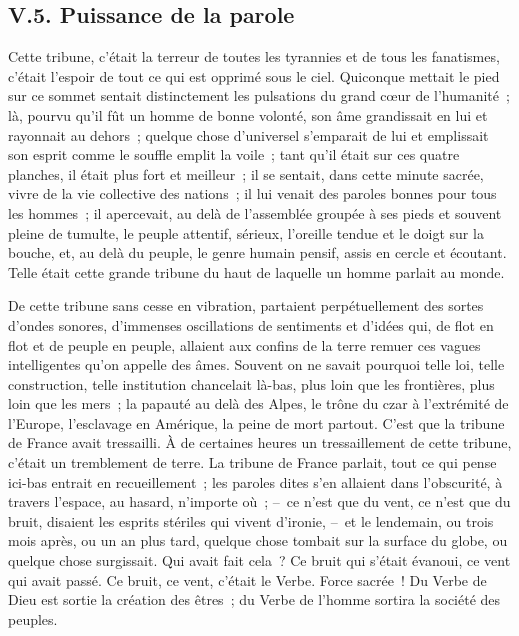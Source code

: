 \documentclass[french,twoside]{book} %
\begin{document}
\subsection[{V.5. Puissance de la parole}]{V.5. Puissance de la parole}
\noindent Cette tribune, c’était la terreur de toutes les tyrannies et de tous les fanatismes, c’était l’espoir de tout ce qui est opprimé sous le ciel. Quiconque mettait le pied sur ce sommet sentait distinctement les pulsations du grand cœur de l’humanité ; là, pourvu qu’il fût un homme de bonne volonté, son âme grandissait en lui et rayonnait au dehors ; quelque chose d’universel s’emparait de lui et emplissait son esprit comme le souffle emplit la voile ; tant qu’il était sur ces quatre planches, il était plus fort et meilleur ; il se sentait, dans cette minute sacrée, vivre de la vie collective des nations ; il lui venait des paroles bonnes pour tous les hommes ; il apercevait, au delà de l’assemblée groupée à ses pieds et souvent pleine de tumulte, le peuple attentif, sérieux, l’oreille tendue et le doigt sur la bouche, et, au delà du peuple, le genre humain pensif, assis en cercle et écoutant. Telle était cette grande tribune du haut de laquelle un homme parlait au monde.\par
De cette tribune sans cesse en vibration, partaient perpétuellement des sortes d’ondes sonores, d’immenses oscillations de sentiments et d’idées qui, de flot en flot et de peuple en peuple, allaient aux confins de la terre remuer ces vagues intelligentes qu’on appelle des âmes. Souvent on ne savait pourquoi telle loi, telle construction, telle institution chancelait là-bas, plus loin que les frontières, plus loin que les mers ; la papauté au delà des Alpes, le trône du czar à l’extrémité de l’Europe, l’esclavage en Amérique, la peine de mort partout. C’est que la tribune de France avait tressailli. À de certaines heures un tressaillement de cette tribune, c’était un tremblement de terre. La tribune de France parlait, tout ce qui pense ici-bas entrait en recueillement ; les paroles dites s’en allaient dans l’obscurité, à travers l’espace, au hasard, n’importe où ; – ce n’est que du vent, ce n’est que du bruit, disaient les esprits stériles qui vivent d’ironie, – et le lendemain, ou trois mois après, ou un an plus tard, quelque chose tombait sur la surface du globe, ou quelque chose surgissait. Qui avait fait cela ? Ce bruit qui s’était évanoui, ce vent qui avait passé. Ce bruit, ce vent, c’était le Verbe. Force sacrée ! Du Verbe de Dieu est sortie la création des êtres ; du Verbe de l’homme sortira la société des peuples.
\end{document}
